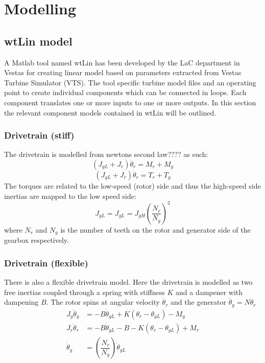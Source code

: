 \section{Modelling} \label{sec:mod} %

\subsection{wtLin model}
A Matlab tool named wtLin has been developed by the LaC department in Vestas for creating linear model based on parameters extracted from Vestas Turbine Simulator (VTS). The tool specific turbine model files and an operating point to create individual components which can be connected in loops. Each component translates one or more inputs to one or more outputs. In this section the relevant component models contained in wtLin will be outlined.\\

\subsubsection{Drivetrain (stiff)}
The drivetrain is modelled from newtons second law???? as such:
\begin{equation}\label{eq:wtlin_comp_drivetrain}
	(J_{gL} + J_{r}) \ddot{\theta}_r = M_{r} + M_{g}
\end{equation}
\begin{equation}\label{eq:wtlin_comp_drivetrain}
	(J_{gL} + J_{r}) \ddot{\theta}_r = T_{r} + T_{g}
\end{equation}
The torques are related to the low-speed (rotor) side and thus the high-speed side inertias are mapped to the low speed side:
\begin{equation} \label{eq:wtlin_comp_inertiamap}
	J_{gL} = J_{gL} = J_{gH} \left(\dfrac{N_r}{N_g}\right)^2
\end{equation}
where $ N_r $ and $ N_g $ is the number of teeth on the rotor and generator side of the gearbox respectively.


\subsubsection{Drivetrain (flexible)}
There is also a flexible drivetrain model. Here the drivetrain is modelled as two free inertias coupled through a spring with stiffness $ K $ and a dampener with dampening $ B $. The rotor spins at angular velocity $ \ddot{\theta}_r $ and the generator $ \ddot{\theta}_g = N \ddot{\theta}_r $
\begin{align} \label{eq:wtlin_comp_drivetrain_flex}
	J_{g} \ddot{\theta}_g & = -B \dot{\theta}_{gL} + K(\theta_r - \theta_{gL}) - M_{g} \\
	J_{r} \ddot{\theta}_r & = -B \dot{\theta}_{gL} -B - K(\theta_r - \theta_{gL}) + M_{r} \\
	\dot{\theta}_g & = \left(\dfrac{N_r}{N_g}\right) \dot{\theta}_{gL}
\end{align}












%	

